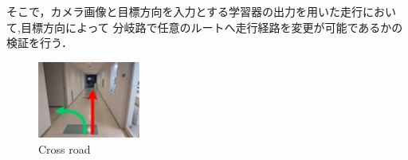 \documentclass[10pt]{jarticle}
\begin{document}
    そこで，カメラ画像と目標方向を入力とする学習器の出力を用いた走行において,目標方向によって
    分岐路で任意のルートへ走行経路を変更が可能であるかの検証を行う．
    \begin{center}
        \begin{figure}[h]
            \centering
            \includegraphics[width=0.3\textwidth]{./fig/bunki.pdf}
            \caption{Cross road}
            \label{fig:bunki}
        \end{figure}
    \end{center}
    
    
    
    
    
\end{document}
